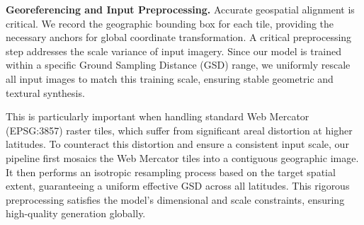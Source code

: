 \documentclass{llmxive}
\providecommand{\paragraph}[1]{\noindent\textbf{#1.}\hspace*{1em}}
\begin{document}
\paragraph{Georeferencing and Input Preprocessing}
Accurate geospatial alignment is critical. We record the geographic bounding box for each tile, providing the necessary anchors for global coordinate transformation. A critical preprocessing step addresses the scale variance of input imagery. Since our model is trained within a specific Ground Sampling Distance (GSD) range, we uniformly rescale all input images to match this training scale, ensuring stable geometric and textural synthesis.

This is particularly important when handling standard Web Mercator (EPSG:3857) raster tiles, which suffer from significant areal distortion at higher latitudes. To counteract this distortion and ensure a consistent input scale, our pipeline first mosaics the Web Mercator tiles into a contiguous geographic image. It then performs an isotropic resampling process based on the target spatial extent, guaranteeing a uniform effective GSD across all latitudes. This rigorous preprocessing satisfies the model's dimensional and scale constraints, ensuring high-quality generation globally.



\end{document}
